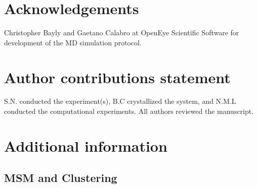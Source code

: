 \documentclass[fleqn,10pt]{wlscirep}
\begin{document}


\section{Acknowledgements}

Christopher Bayly and Gaetano Calabro at OpenEye Scientific Software for development of the MD simulation protocol.

\section{Author contributions statement}

S.N. conducted the experiment(s),  B.C crystallized the system, and N.M.L conducted the computational experiments.  All authors reviewed the manuscript.

\section{Additional information}

\subsection{MSM and Clustering}
\end{document}
